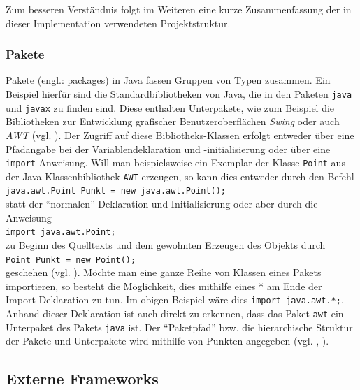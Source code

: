 \documentclass[paper=a4, DIV=calc, BCOR=15mm, twoside=on, onecolumn=on, open = right, titlepage =on, parskip =half, headsepline = on, footsepline = on, chapterprefix = off, appendixprefix = off, fontsize = 12pt, numbers = noenddot, abstract = on]{scrbook}
\begin{document}
Zum besseren Verständnis folgt im Weiteren eine kurze Zusammenfassung der in dieser Implementation verwendeten Projektstruktur.

\subsubsection*{Pakete}

Pakete (engl.: packages) in Java fassen Gruppen von Typen zusammen. Ein Beispiel hierfür sind die Standardbibliotheken von Java, die in den Paketen \texttt{java} und \texttt{javax} zu finden sind. Diese enthalten Unterpakete, wie zum Beispiel die Bibliotheken zur Entwicklung grafischer Benutzeroberflächen \emph{Swing} oder auch \emph{AWT} (vgl. \cite[S.265]{ullenboom:12}).
Der Zugriff auf diese Bibliotheks-Klassen erfolgt entweder über eine Pfadangabe bei der Variablendeklaration und -initialisierung oder über eine \texttt{import}-Anweisung. Will man beispielsweise ein Exemplar der Klasse \texttt{Point} aus der Java-Klassenbibliothek \texttt{AWT} erzeugen, so kann dies entweder durch den Befehl\\
\hspace*{2em} \texttt{java.awt.Point Punkt = new java.awt.Point();}\\
statt der "`normalen"' Deklaration und Initialisierung oder aber durch die Anweisung\\ \hspace*{2em} \texttt{import java.awt.Point;}\\
zu Beginn des Quelltexts und dem gewohnten Erzeugen des Objekts durch\\
\hspace*{2em} \texttt{Point Punkt = new Point();}\\
geschehen (vgl. \cite[S.266]{ullenboom:12}).
Möchte man eine ganze Reihe von Klassen eines Pakets importieren, so besteht die Möglichkeit, dies mithilfe eines * am Ende der Import-Deklaration zu tun. Im obigen Beispiel wäre dies \texttt{import java.awt.*;}. Anhand dieser Deklaration ist auch direkt zu erkennen, dass das Paket \texttt{awt} ein Unterpaket des Pakets \texttt{java} ist. Der "`Paketpfad"' bzw. die hierarchische Struktur der Pakete und Unterpakete wird mithilfe von Punkten angegeben (vgl. \cite[S.265ff.]{ullenboom:12}, \cite[S.84ff.]{abts:15}).
\clearpage

\subsection{Externe Frameworks}
\vspace*{-1ex}
\end{document}
